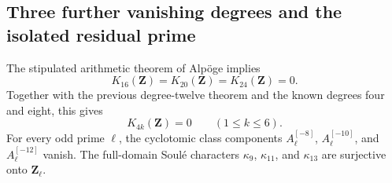 \subsection{Three further vanishing degrees and the isolated residual prime}
\label{sec:higher-k-vanishing}

\begin{theorem}[K17-K16-K20-K24]\label{thm:higher-k-vanish}
The stipulated arithmetic theorem of Alp\"oge implies
\[
 K_{16}(\mathbf Z)=K_{20}(\mathbf Z)=K_{24}(\mathbf Z)=0.
\]
Together with the previous degree-twelve theorem and the known degrees
four and eight, this gives
\[
                  K_{4k}(\mathbf Z)=0\qquad(1\le k\le6).
 \tag{HK.1}
\]
For every odd prime $\ell$, the cyclotomic class components
$A_\ell^{[-8]}$, $A_\ell^{[-10]}$, and $A_\ell^{[-12]}$ vanish.
The full-domain Soul\'e characters $\kappa_9$, $\kappa_{11}$, and
$\kappa_{13}$ are surjective onto $\mathbf Z_\ell$.
\end{theorem}

